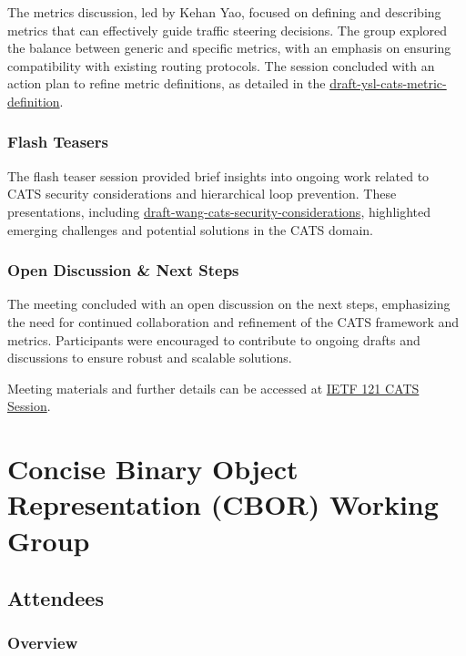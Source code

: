 \documentclass{article}
\begin{document}
The metrics discussion, led by Kehan Yao, focused on defining and describing metrics that can effectively guide traffic steering decisions. The group explored the balance between generic and specific metrics, with an emphasis on ensuring compatibility with existing routing protocols. The session concluded with an action plan to refine metric definitions, as detailed in the \href{https://datatracker.ietf.org/doc/html/draft-ysl-cats-metric-definition}{draft-ysl-cats-metric-definition}.

\subsubsection{Flash Teasers}

The flash teaser session provided brief insights into ongoing work related to CATS security considerations and hierarchical loop prevention. These presentations, including \href{https://datatracker.ietf.org/doc/html/draft-wang-cats-security-considerations}{draft-wang-cats-security-considerations}, highlighted emerging challenges and potential solutions in the CATS domain.

\subsubsection{Open Discussion \& Next Steps}

The meeting concluded with an open discussion on the next steps, emphasizing the need for continued collaboration and refinement of the CATS framework and metrics. Participants were encouraged to contribute to ongoing drafts and discussions to ensure robust and scalable solutions.

Meeting materials and further details can be accessed at \href{https://datatracker.ietf.org/meeting/121/session/cats}{IETF 121 CATS Session}.




\newpage

\section{Concise Binary Object Representation (CBOR) Working Group}

\subsection{Attendees}

\subsubsection{Overview}
\end{document}
